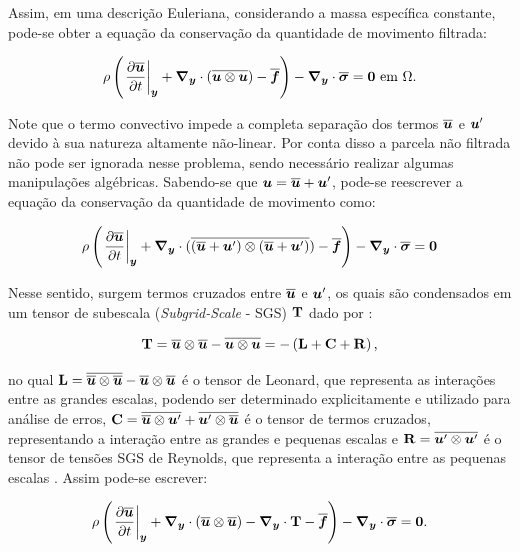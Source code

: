 Assim, em uma descrição Euleriana, considerando a massa específica constante, pode-se obter a equação da conservação da quantidade de movimento filtrada:

\begin{equation}
    \rho\left({\left.\frac{\partial \overline{\boldsymbol{u}}}{\partial t}\right|_{\boldsymbol{y}}+\boldsymbol{\nabla_y}\cdot(\overline{\boldsymbol{u}\otimes\boldsymbol{u}})-\overline{\boldsymbol{f}}}\right)-\boldsymbol{\nabla_y}\cdot\overline{\boldsymbol{\sigma}}=\boldsymbol{0}\text{ em }\Omega\text{.}
\end{equation}

Note que o termo convectivo impede a completa separação dos termos $\overline{\boldsymbol{u}}$ e $\boldsymbol{u}'$ devido à sua natureza altamente não-linear. Por conta disso a parcela não filtrada não pode ser ignorada nesse problema, sendo necessário realizar algumas manipulações algébricas. Sabendo-se que $\boldsymbol{u}=\overline{\boldsymbol{u}}+\boldsymbol{u}'$, pode-se reescrever a equação da conservação da quantidade de movimento como:

\begin{equation}
    \rho\left({\left.\frac{\partial \overline{\boldsymbol{u}}}{\partial t}\right|_{\boldsymbol{y}}+\boldsymbol{\nabla_y}\cdot(\overline{(\overline{\boldsymbol{u}}+\boldsymbol{u}')\otimes(\overline{\boldsymbol{u}}+\boldsymbol{u}')})-\overline{\boldsymbol{f}}}\right)-\boldsymbol{\nabla_y}\cdot\overline{\boldsymbol{\sigma}}=\boldsymbol{0}
\end{equation}

Nesse sentido, surgem termos cruzados entre $\overline{\boldsymbol{u}}$ e $\boldsymbol{u}'$, os quais são condensados em um tensor de subescala (\textit{Subgrid-Scale} - SGS) $\mathbf{T}$ dado por \cite{piomelli1999large,hughes2000large}:

\begin{equation}
    \mathbf{T}=\overline{\boldsymbol{u}}\otimes\overline{\boldsymbol{u}}-\overline{\boldsymbol{u}\otimes\boldsymbol{u}}=-\left({\mathbf{L}+\mathbf{C}+\mathbf{R}}\right)\text{,}
\end{equation}

\noindent no qual $\mathbf{L}=\overline{\overline{\boldsymbol{u}}\otimes\overline{\boldsymbol{u}}}-\overline{\boldsymbol{u}}\otimes\overline{\boldsymbol{u}}$ é o tensor de Leonard, que representa as interações entre as grandes escalas, podendo ser determinado explicitamente e utilizado para análise de erros, $\mathbf{C}=\overline{\overline{\boldsymbol{u}}\otimes\boldsymbol{u}'}+\overline{\boldsymbol{u}'\otimes\overline{\boldsymbol{u}}}$ é o tensor de termos cruzados, representando a interação entre as grandes e pequenas escalas e $\mathbf{R}=\overline{\boldsymbol{u}'\otimes\boldsymbol{u}'}$ é o tensor de tensões SGS de Reynolds, que representa a interação entre as pequenas escalas \cite{piomelli1999large}. Assim pode-se escrever:

\begin{equation}
    \rho\left({\left.\frac{\partial \overline{\boldsymbol{u}}}{\partial t}\right|_{\boldsymbol{y}}+\boldsymbol{\nabla_y}\cdot(\overline{\boldsymbol{u}}\otimes\overline{\boldsymbol{u}})-\boldsymbol{\nabla_y}\cdot\mathbf{T}-\overline{\boldsymbol{f}}}\right)-\boldsymbol{\nabla_y}\cdot\overline{\boldsymbol{\sigma}}=\boldsymbol{0}\text{.}
\end{equation}

